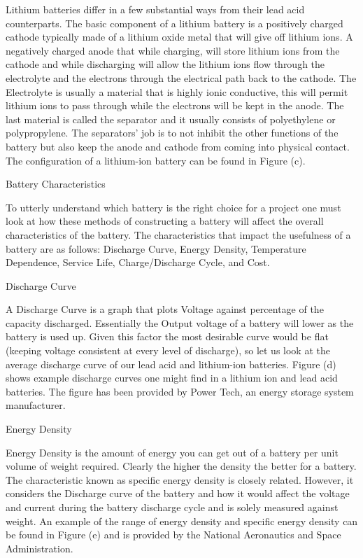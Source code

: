 Lithium batteries differ in a few substantial ways from their lead acid counterparts. The basic component of a lithium battery is a positively charged cathode typically made of a lithium oxide metal that will give off lithium ions. A negatively charged anode that while charging, will store lithium ions from the cathode and while discharging will allow the lithium ions flow through the electrolyte and the electrons through the electrical path back to the cathode. The Electrolyte is usually a material that is highly ionic conductive, this will permit lithium ions to pass through while the electrons will be kept in the anode. The last material is called the separator and it usually consists of polyethylene or polypropylene. The separators' job is to not inhibit the other functions of the battery but also keep the anode and cathode from coming into physical contact. The configuration of a lithium-ion battery can be found in Figure (c). 

Battery Characteristics 

To utterly understand which battery is the right choice for a project one must look at how these methods of constructing a battery will affect the overall characteristics of the battery. The characteristics that impact the usefulness of a battery are as follows: Discharge Curve, Energy Density, Temperature Dependence, Service Life, Charge/Discharge Cycle, and Cost.

Discharge Curve 

A Discharge Curve is a graph that plots Voltage against percentage of the capacity discharged. Essentially the Output voltage of a battery will lower as the battery is used up. Given this factor the most desirable curve would be flat (keeping voltage consistent at every level of discharge), so let us look at the average discharge curve of our lead acid and lithium-ion batteries. Figure (d) shows example discharge curves one might find in a lithium ion and lead acid batteries. The figure has been provided by Power Tech, an energy storage system manufacturer. 

Energy Density 

Energy Density is the amount of energy you can get out of a battery per unit volume of weight required. Clearly the higher the density the better for a battery. The characteristic known as specific energy density is closely related. However, it considers the Discharge curve of the battery and how it would affect the voltage and current during the battery discharge cycle and is solely measured against weight. An example of the range of energy density and specific energy density can be found in Figure (e) and is provided by the National Aeronautics and Space Administration.

